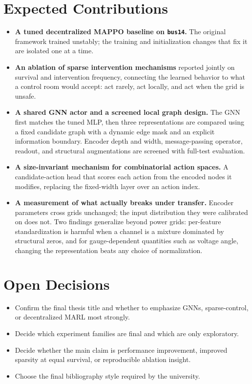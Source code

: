 \section{Expected Contributions}
\label{sec:plan-contributions}

\begin{itemize}
  \item \textbf{A tuned decentralized MAPPO baseline on \texttt{bus14}.} The
  original framework trained unstably; the training and initialization changes
  that fix it are isolated one at a time.

  \item \textbf{An ablation of sparse intervention mechanisms} reported jointly
  on survival and intervention frequency, connecting the learned behavior to
  what a control room would accept: act rarely, act locally, and act when the
  grid is unsafe.

  \item \textbf{A shared GNN actor and a screened local graph design.} The GNN
  first matches the tuned MLP, then three representations are compared using a
  fixed candidate graph with a dynamic edge mask and an explicit information
  boundary. Encoder depth and width, message-passing operator, readout, and
  structural augmentations are screened with full-test evaluation.

  \item \textbf{A size-invariant mechanism for combinatorial action spaces.} A
  candidate-action head that scores each action from the encoded nodes it
  modifies, replacing the fixed-width layer over an action index.

  \item \textbf{A measurement of what actually breaks under transfer.} Encoder
  parameters cross grids unchanged; the input distribution they were calibrated
  on does not. Two findings generalize beyond power grids: per-feature
  standardization is harmful when a channel is a mixture dominated by structural
  zeros, and for gauge-dependent quantities such as voltage angle, changing the
  representation beats any choice of normalization.
\end{itemize}

\section{Open Decisions}

\begin{itemize}
  \item Confirm the final thesis title and whether to emphasize GNNs,
  sparse-control, or decentralized MARL most strongly.
  \item Decide which experiment families are final and which are only
  exploratory.
  \item Decide whether the main claim is performance improvement, improved
  sparsity at equal survival, or reproducible ablation insight.
  \item Choose the final bibliography style required by the university.
\end{itemize}
